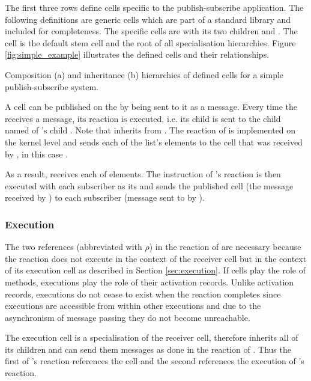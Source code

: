 The first three rows define cells specific to the publish-subscribe application. The following definitions are generic cells which are part of a standard library and included for completeness. The specific cells are  with its two children  and . The cell  is the default stem cell and the root of all specialisation hierarchies. Figure \ref{fig:simple_example} illustrates the defined cells and their relationships.

{Composition (a) and inheritance (b) hierarchies of defined cells for a simple publish-subscribe system.}

A cell can be published on the  by being sent to it as a message. Every time the  receives a message, its reaction is executed, i.e. its child  is sent to the child named  of 's child . Note that  inherits  from . The reaction of  is implemented on the kernel level and sends each of the list's elements to the cell that was received by , in this case .

As a result,  receives each of  elements. The instruction of 's reaction is then executed with each subscriber as its  and sends the published cell (the message received by ) to each subscriber (message sent to  by ).

\subsubsection{Execution}

The two  references (abbreviated with $\rho$) in the reaction of  are necessary because the reaction does not execute in the context of the receiver cell but in the context of its execution cell as described in Section \ref{sec:execution}. If cells play the role of methods, executions play the role of their activation records. Unlike activation records, executions do not cease to exist when the reaction completes since executions are accessible from within other executions and due to the asynchronism of message passing they do not become unreachable.

The execution cell is a specialisation of the receiver cell, therefore inherits all of its children and can send them messages as done in the reaction of . Thus the first  of 's reaction references the  cell and the second  references the execution of 's reaction.

